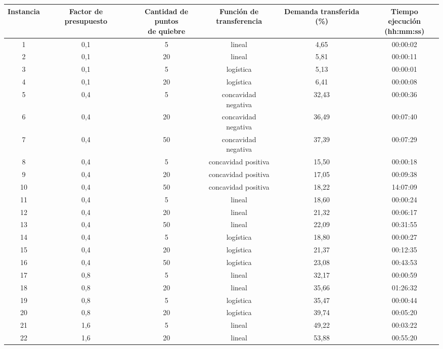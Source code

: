 \begin{table}
  \centering
  \small
  \begin{tabular}{cccccc}
      \toprule
      Instancia & Factor de presupuesto & \shortstack{Cantidad de puntos \\ de quiebre} & \shortstack{Función de \\ transferencia} & Demanda transferida (\%) & \shortstack{Tiempo ejecución \\ (hh:mm:ss)} \\
      \midrule
      1 & 0,1 & 5 & lineal & 4,65 & 00:00:02 \\
      2 & 0,1 & 20 & lineal & 5,81 & 00:00:11 \\
      3 & 0,1 & 5 & logística & 5,13 & 00:00:01 \\
      4 & 0,1 & 20 & logística & 6,41 & 00:00:08 \\
      5 & 0,4 & 5 & concavidad negativa & 32,43 & 00:00:36 \\
      6 & 0,4 & 20 & concavidad negativa & 36,49 & 00:07:40 \\
      7 & 0,4 & 50 & concavidad negativa & 37,39 & 00:07:29 \\
      8 & 0,4 & 5 & concavidad positiva & 15,50 & 00:00:18 \\
      9 & 0,4 & 20 & concavidad positiva & 17,05 & 00:09:38 \\
      10 & 0,4 & 50 & concavidad positiva & 18,22 & 14:07:09 \\
      11 & 0,4 & 5 & lineal & 18,60 & 00:00:24 \\
      12 & 0,4 & 20 & lineal & 21,32 & 00:06:17 \\
      13 & 0,4 & 50 & lineal & 22,09 & 00:31:55 \\
      14 & 0,4 & 5 & logística & 18,80 & 00:00:27 \\
      15 & 0,4 & 20 & logística & 21,37 & 00:12:35 \\
      16 & 0,4 & 50 & logística & 23,08 & 00:43:53 \\
      17 & 0,8 & 5 & lineal & 32,17 & 00:00:59 \\
      18 & 0,8 & 20 & lineal & 35,66 & 01:26:32 \\
      19 & 0,8 & 5 & logística & 35,47 & 00:00:44 \\
      20 & 0,8 & 20 & logística & 39,74 & 00:05:20 \\
      21 & 1,6 & 5 & lineal & 49,22 & 00:03:22 \\
      22 & 1,6 & 20 & lineal & 53,88 & 00:55:20 \\

\end{tabular}
\end{table}
